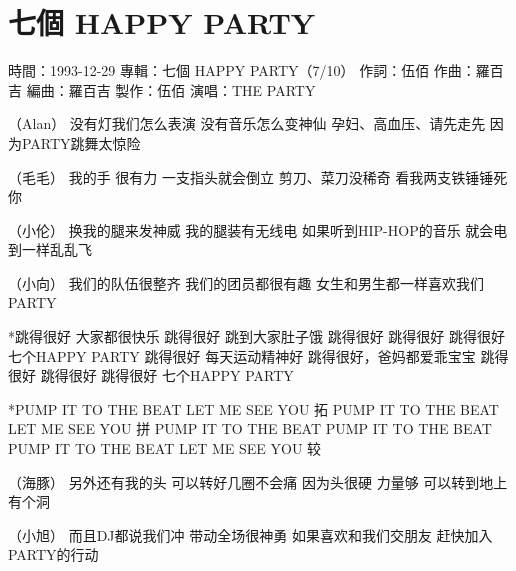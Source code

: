 \documentclass[UTF8,a4paper,oneside,twocolumn,12pt]{ctexbook}
\newcommand{\infopair}[2]{\textbullet #1：#2}
\newcommand{\zc}[1][伍佰]{\infopair{作詞}{#1}}
\newcommand{\zq}[1][伍佰]{\infopair{作曲}{#1}}
\newcommand{\bq}[1][伍佰]{\infopair{編曲}{#1}}
\newcommand{\zj}[1]{\infopair{專輯}{#1}}
\newcommand{\zz}[1]{\infopair{製作}{#1}}
\newcommand{\sj}[1]{\infopair{時間}{#1}}
\newenvironment{info}{\begin{flushleft}\kaishu
	}
	{\end{flushleft}\normalsize\yahei\par}
\newenvironment{lyric}{
	}
{}
\begin{document}
\section{七個 HAPPY PARTY}
\begin{info}
	\sj{1993-12-29}
	\zj{七個 HAPPY PARTY（7/10）}
	\zc
	\zq[羅百吉]
	\bq[羅百吉]
	\zz{伍佰}
	\infopair{演唱}{THE PARTY}
\end{info}
\begin{lyric}
	（Alan）
	没有灯我们怎么表演 没有音乐怎么变神仙
	孕妇、高血压、请先走先 因为PARTY跳舞太惊险

	（毛毛）
	我的手 很有力 一支指头就会倒立
	剪刀、菜刀没稀奇 看我两支铁锤锤死你

	（小伦）
	换我的腿来发神威 我的腿装有无线电
	如果听到HIP-HOP的音乐 就会电到一样乱乱飞

	（小向）
	我们的队伍很整齐 我们的团员都很有趣
	女生和男生都一样喜欢我们PARTY

	*跳得很好 大家都很快乐 跳得很好 跳到大家肚子饿
	跳得很好 跳得很好 跳得很好 七个HAPPY PARTY
	跳得很好 每天运动精神好 跳得很好，爸妈都爱乖宝宝
	跳得很好 跳得很好 跳得很好 七个HAPPY PARTY

	*PUMP IT TO THE BEAT LET ME SEE YOU 拓
	PUMP IT TO THE BEAT LET ME SEE YOU 拼
	PUMP IT TO THE BEAT PUMP IT TO THE BEAT
	PUMP IT TO THE BEAT LET ME SEE YOU 较

	（海豚）
	另外还有我的头 可以转好几圈不会痛
	因为头很硬 力量够 可以转到地上有个洞

	（小旭）
	而且DJ都说我们冲 带动全场很神勇
	如果喜欢和我们交朋友 赶快加入PARTY的行动
\end{lyric}
\end{document}
